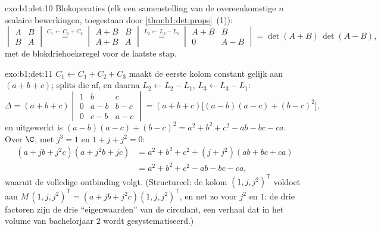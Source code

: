 \begin{solution}{exo:b1:det:10}
Blokoperaties (elk een samenstelling van de overeenkomstige $n$
scalaire bewerkingen, toegestaan door
\cref{thm:b1:det:props}~(1)):
\[
\begin{vmatrix} A & B\\ B & A\end{vmatrix}
\overset{C_1 \leftarrow C_1 + C_2}{=}
\begin{vmatrix} A + B & B\\ A + B & A\end{vmatrix}
\overset{L_2 \leftarrow L_2 - L_1}{=}
\begin{vmatrix} A + B & B\\ 0 & A - B\end{vmatrix}
= \det(A+B)\,\det(A-B),
\]
met de blokdriehoeksregel voor de laatste stap.
\end{solution}

\begin{solution}{exo:b1:det:11}
$C_1 \leftarrow C_1 + C_2 + C_3$ maakt de eerste kolom constant
gelijk aan $(a + b + c)$; splits die af, en daarna $L_2 \leftarrow
L_2 - L_1$, $L_3 \leftarrow L_3 - L_1$:
\[
\Delta = (a+b+c)\begin{vmatrix}
1 & b & c\\
0 & a - b & b - c\\
0 & c - b & a - c
\end{vmatrix}
= (a+b+c)\bigl[(a-b)(a-c) + (b-c)^2\bigr],
\]
en uitgewerkt is $(a-b)(a-c) + (b-c)^2 = a^2 + b^2 + c^2 - ab - bc
- ca$. Over $\C$, met $j^3 = 1$ en $1 + j + j^2 = 0$:
\begin{align*}
(a + jb + j^2c)(a + j^2b + jc)
&= a^2 + b^2 + c^2 + (j + j^2)(ab + bc + ca)\\
&= a^2 + b^2 + c^2 - ab - bc - ca ,
\end{align*}
waaruit de volledige ontbinding volgt. (Structureel: de kolom $(1,
j, j^2)^{\mathsf T}$ voldoet aan $M\,(1, j, j^2)^{\mathsf T} = (a +
jb + j^2c)(1, j, j^2)^{\mathsf T}$, en net zo voor $j^2$ en $1$: de
drie factoren zijn de drie ``eigenwaarden'' van de circulant, een
verhaal dat in het volume van bachelorjaar 2 wordt
gesystematiseerd.)
\end{solution}

